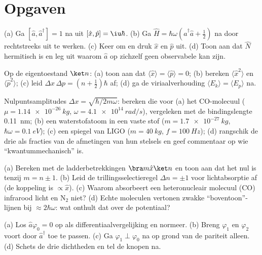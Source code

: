 \section{Opgaven}

\begin{exercise}[$\star$]\label{exo:b3:harmonic-oscillator:1}
(a) Ga $[\hat a, \hat a^\dagger] = 1$ na uit $[\hat x, \hat p] =
\iu\hbar$. (b) Ga $\hat H = \hbar\omega(\hat a^\dagger\hat a +
\tfrac12)$ na door rechtstreeks uit te werken. (c) Keer om en druk $\hat x$ en $\hat p$ uit. (d) Toon aan dat $\hat N$ hermitisch is en leg uit
waarom $\hat a$ op zichzelf geen observabele kan zijn.
\end{exercise}

\begin{exercise}[$\star$]\label{exo:b3:harmonic-oscillator:2}
Op de eigentoestand $\ket n$: (a) toon aan dat $\langle\hat x\rangle =
\langle\hat p\rangle = 0$; (b) bereken $\langle\hat x^2\rangle$ en
$\langle\hat p^2\rangle$; (c) leid $\Delta x\,\Delta p = (n +
\tfrac12)\hbar$ af; (d) ga de viriaalverhouding $\langle E_k\rangle =
\langle E_p\rangle$ na.
\end{exercise}

\begin{exercise}[$\star$]\label{exo:b3:harmonic-oscillator:3}
Nulpuntsamplitudes $\Delta x = \sqrt{\hbar/2m\omega}$: bereken die voor
(a) het CO-molecuul ($\mu = \qty{1.14e-26}{kg}$, $\omega =
\qty{4.1e14}{rad/s}$), vergeleken met de bindingslengte \qty{0.11}{nm};
(b) een waterstofatoom in een vaste stof ($m =
\qty{1.7e-27}{kg}$,
$\hbar\omega = \qty{0.1}{eV}$); (c) een spiegel van LIGO ($m = \qty{40}{kg}$, $f = \qty{100}{Hz}$); (d) rangschik de drie als fracties
van de afmetingen van hun stelsels en geef commentaar op wie
``kwantummechanisch'' is.
\end{exercise}

\begin{exercise}[$\star$]\label{exo:b3:harmonic-oscillator:4}
(a) Bereken met de ladderbetrekkingen $\bra m\hat x\ket n$ en toon aan dat
het nul is tenzij $m = n \pm 1$. (b) Leid de trillingsselectieregel
$\Delta n = \pm1$ voor lichtabsorptie af (de koppeling is
$\propto\hat x$). (c) Waarom absorbeert een heteronucleair molecuul (CO)
infrarood licht en N$_2$ niet? (d) Echte moleculen vertonen zwakke
``boventoon''-lijnen bij $\approx 2\hbar\omega$: wat onthult dat over de
potentiaal?
\end{exercise}

\begin{exercise}[$\star\star$]\label{exo:b3:harmonic-oscillator:5}
(a) Los $\hat a\varphi_0 = 0$ op als differentiaalvergelijking en normeer.
(b) Breng $\varphi_1$ en $\varphi_2$ voort door $\hat a^\dagger$ toe te
passen. (c) Ga $\varphi_1 \perp \varphi_0$ na op grond van de pariteit
alleen. (d) Schets de drie dichtheden en tel de knopen na.
\end{exercise}

